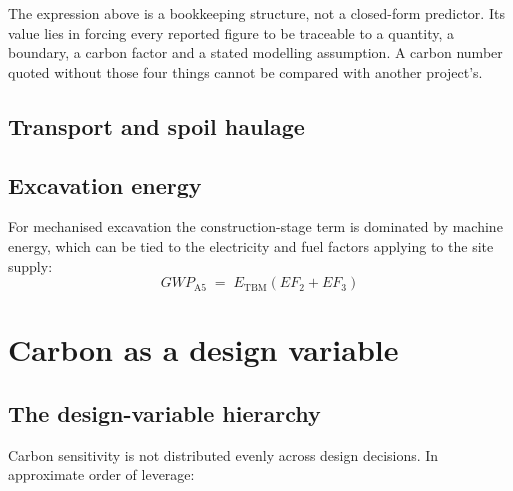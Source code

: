 \begin{warnbox}
The expression above is a bookkeeping structure, not a closed-form predictor.
Its value lies in forcing every reported figure to be traceable to a quantity,
a boundary, a carbon factor and a stated modelling assumption. A carbon number
quoted without those four things cannot be compared with another project's.
\end{warnbox}

\subsection{Transport and spoil haulage}
\label{sec:carbon-transport}

\subsection{Excavation energy}
\label{sec:carbon-tbm-energy}
For mechanised excavation the construction-stage term is dominated by machine
energy, which can be tied to the electricity and fuel factors applying to the
site supply:
\[
GWP_{\mathrm{A5}} \;=\; E_{\mathrm{TBM}} \left( EF_2 + EF_3 \right)
\]

\section{Carbon as a design variable}
\label{sec:carbon-as-design-variable}

\subsection{The design-variable hierarchy}
\label{sec:carbon-hierarchy}
Carbon sensitivity is not distributed evenly across design decisions. In
approximate order of leverage:

